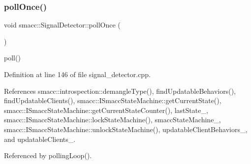 \mbox{\label{classsmacc_1_1SignalDetector_a9a116479e23259f3a5d5d4a47278afd5}} 
\subsubsection{\texorpdfstring{poll\+Once()}{pollOnce()}}
{\footnotesize\ttfamily void smacc\+::\+Signal\+Detector\+::poll\+Once (\begin{DoxyParamCaption}{ }\end{DoxyParamCaption})}

poll() 

Definition at line 146 of file signal\+\_\+detector.\+cpp.



References smacc\+::introspection\+::demangle\+Type(), find\+Updatable\+Behaviors(), find\+Updatable\+Clients(), smacc\+::\+I\+Smacc\+State\+Machine\+::get\+Current\+State(), smacc\+::\+I\+Smacc\+State\+Machine\+::get\+Current\+State\+Counter(), last\+State\+\_\+, smacc\+::\+I\+Smacc\+State\+Machine\+::lock\+State\+Machine(), smacc\+State\+Machine\+\_\+, smacc\+::\+I\+Smacc\+State\+Machine\+::unlock\+State\+Machine(), updatable\+Client\+Behaviors\+\_\+, and updatable\+Clients\+\_\+.



Referenced by polling\+Loop().



